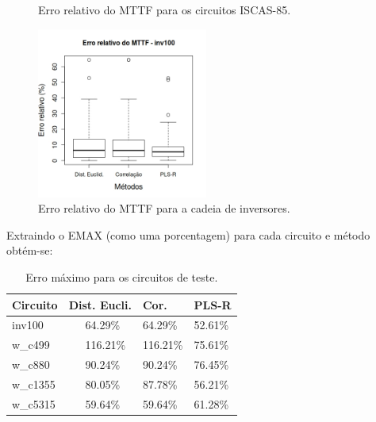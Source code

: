 \begin{figure}[H]
	\caption{Erro relativo do MTTF para os circuitos ISCAS-85.}
	\label{figure:ER_MTTF}
\end{figure}
\begin{figure}[H]
	\center
	\includegraphics[width=0.5\textwidth]{images/erro_relativo_MTTF_inv100_random}
	\caption{Erro relativo do MTTF para a cadeia de inversores.}
	\label{figure:erro_relativo_MTTF_inv100_random}	
\end{figure}

Extraindo o EMAX (como uma porcentagem) para cada circuito e método obtém-se:

\begin{table}[H]
	\centering
	\caption{Erro máximo para os circuitos de teste.}
	\begin{tabular}{@{}l|l|l|l@{}}
		\toprule
		Circuito & Dist. Eucli. & Cor. & PLS-R \\ \midrule
		inv100 & \ \ \ 64.29\% & 64.29\% & 52.61\% \\
		w\_c499 & \ \ \ 116.21\% & 116.21\% & 75.61\% \\
		w\_c880 &  \ \ \ 90.24\% & 90.24\% & 76.45\% \\
		w\_c1355 & \ \ \ 80.05\% & 87.78\% & 56.21\% \\
		w\_c5315 & \ \ \ 59.64\% & 59.64\% & 61.28\% \\
		\bottomrule
	\end{tabular}
	\label{tb:erro_maximo_ISCAS}
\end{table}

